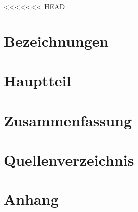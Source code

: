 \documentclass[a4paper,12pt]{article}
\begin{document}
<<<<<<< HEAD



\tableofcontents
\section{Bezeichnungen}

\section{Hauptteil}

\section{Zusammenfassung}

\section{Quellenverzeichnis}

\section{Anhang}

\end{document}
